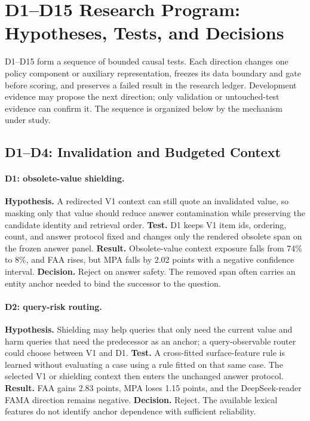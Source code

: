 \documentclass[10pt]{article}
\begin{document}
\section{D1--D15 Research Program: Hypotheses, Tests, and Decisions}
\label{sec:d1d15}

D1--D15 form a sequence of bounded causal tests. Each direction changes one policy component or auxiliary representation, freezes its data boundary and gate before scoring, and preserves a failed result in the research ledger. Development evidence may propose the next direction; only validation or untouched-test evidence can confirm it. The sequence is organized below by the mechanism under study.

\subsection{D1--D4: Invalidation and Budgeted Context}

\paragraph{D1: obsolete-value shielding.}
\textbf{Hypothesis.} A redirected V1 context can still quote an invalidated value, so masking only that value should reduce answer contamination while preserving the candidate identity and retrieval order. \textbf{Test.} D1 keeps V1 item ids, ordering, count, and answer protocol fixed and changes only the rendered obsolete span on the frozen answer panel. \textbf{Result.} Obsolete-value context exposure falls from 74\% to 8\%, and FAA rises, but MPA falls by 2.02 points with a negative confidence interval. \textbf{Decision.} Reject on answer safety. The removed span often carries an entity anchor needed to bind the successor to the question.

\paragraph{D2: query-risk routing.}
\textbf{Hypothesis.} Shielding may help queries that only need the current value and harm queries that need the predecessor as an anchor; a query-observable router could choose between V1 and D1. \textbf{Test.} A cross-fitted surface-feature rule is learned without evaluating a case using a rule fitted on that same case. The selected V1 or shielding context then enters the unchanged answer protocol. \textbf{Result.} FAA gains 2.83 points, MPA loses 1.15 points, and the DeepSeek-reader FAMA direction remains negative. \textbf{Decision.} Reject. The available lexical features do not identify anchor dependence with sufficient reliability.
\end{document}
